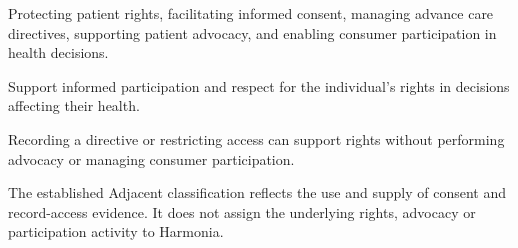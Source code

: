 
Protecting patient rights, facilitating informed consent, managing advance care directives, supporting patient advocacy, and enabling consumer participation in health decisions.



Support informed participation and respect for the individual's rights in decisions affecting their health.



Recording a directive or restricting access can support rights without performing advocacy or managing consumer participation.



The established Adjacent classification reflects the use and supply of consent and record-access evidence. It does not assign the underlying rights, advocacy or participation activity to Harmonia.


